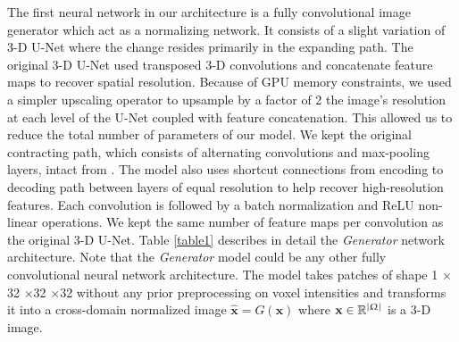 \documentclass[preprint,12pt]{elsarticle}
\renewcommand{\vec}[1]{\mathbf{#1}}
\newcommand{\xx}{\vec{x}}
\newcommand{\xnorm}{\widehat{\vec{x}}}
\newcommand{\real}{\mathbb{R}}
\newcommand{\img}{\Upomega}
\newcommand{\ttm}{$\times$}
\begin{document}
The first neural network in our architecture is a fully convolutional image generator which act as a normalizing network. It consists of a slight variation of 3-D U-Net \cite{Cicek} where the change resides primarily in the expanding path. The original 3-D U-Net used transposed 3-D convolutions and concatenate feature maps to recover spatial resolution. Because of GPU memory constraints, we used a simpler upscaling operator to upsample by a factor of 2 the image's resolution at each level of the U-Net coupled with feature concatenation. This allowed us to reduce the total number of parameters of our model. We kept the original contracting path, which consists of alternating convolutions and max-pooling layers, intact from \cite{Cicek}. The model also uses shortcut connections from encoding to decoding path between layers of equal resolution to help recover high-resolution features. Each convolution is followed by a batch normalization and ReLU non-linear operations. We kept the same number of feature maps per convolution as the original 3-D U-Net. Table \ref{table1} describes in detail the \emph{Generator} network architecture. Note that the \emph{Generator} model could be any other fully convolutional neural network architecture. The model takes patches of shape 1 \ttm 32 \ttm 32 \ttm 32 without any prior preprocessing on voxel intensities and transforms it into a cross-domain normalized image $\xnorm = G(\xx)$ where $\xx \in \real^{|\img|}$ is a 3-D image.
\end{document}
